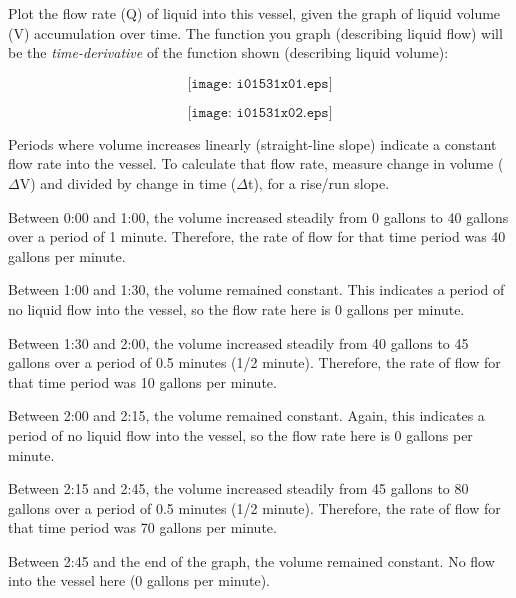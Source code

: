 

Plot the flow rate (Q) of liquid into this vessel, given the graph of liquid volume (V) accumulation over time.  The function you graph (describing liquid flow) will be the {\it time-derivative} of the function shown (describing liquid volume):

$$\texttt{[image: i01531x01.eps]}$$







$$\texttt{[image: i01531x02.eps]}$$

Periods where volume increases linearly (straight-line slope) indicate a constant flow rate into the vessel.  To calculate that flow rate, measure change in volume ($\Delta$V) and divided by change in time ($\Delta$t), for a rise/run slope.

\vskip 10pt

Between 0:00 and 1:00, the volume increased steadily from 0 gallons to 40 gallons over a period of 1 minute.  Therefore, the rate of flow for that time period was 40 gallons per minute.

\vskip 10pt

Between 1:00 and 1:30, the volume remained constant.  This indicates a period of no liquid flow into the vessel, so the flow rate here is 0 gallons per minute.

\vskip 10pt

Between 1:30 and 2:00, the volume increased steadily from 40 gallons to 45 gallons over a period of 0.5 minutes (1/2 minute).  Therefore, the rate of flow for that time period was 10 gallons per minute.

\vskip 10pt

Between 2:00 and 2:15, the volume remained constant.  Again, this indicates a period of no liquid flow into the vessel, so the flow rate here is 0 gallons per minute.

\vskip 10pt

Between 2:15 and 2:45, the volume increased steadily from 45 gallons to 80 gallons over a period of 0.5 minutes (1/2 minute).  Therefore, the rate of flow for that time period was 70 gallons per minute.

\vskip 10pt

Between 2:45 and the end of the graph, the volume remained constant.  No flow into the vessel here (0 gallons per minute).












